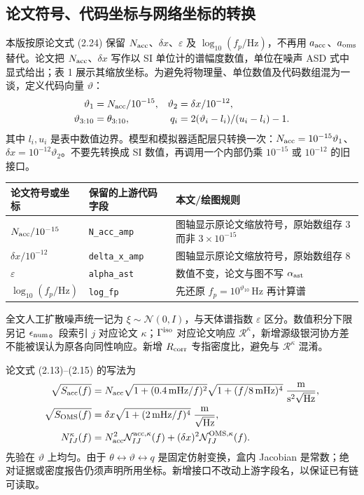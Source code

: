 \documentclass[UTF8,fontset=none,a4paper,11pt]{ctexart}
\begin{document}
\subsection{论文符号、代码坐标与网络坐标的转换}
本版按原论文式 (2.24) 保留 $N_{\rm acc}$、$\delta x$、$\varepsilon$ 及 $\log_{10}(f_p/\mathrm{Hz})$，不再用 $a_{\rm acc}$、$a_{\rm oms}$ 替代。论文把 $N_{\rm acc}$、$\delta x$ 写作以 SI 单位计的谱幅度数值，单位在噪声 ASD 式中显式给出；表 1 展示其缩放坐标。为避免将物理量、单位数值及代码数组混为一谈，定义代码向量 $\vartheta$：
\begin{align}
\vartheta_1&=N_{\rm acc}/10^{-15},&\vartheta_2&=\delta x/10^{-12},\\
\vartheta_{3:10}&=\theta_{3:10},&q_i&=2(\vartheta_i-l_i)/(u_i-l_i)-1.
\end{align}
其中 $l_i,u_i$ 是表中数值边界。模型和模拟器适配层只转换一次：$N_{\rm acc}=10^{-15}\vartheta_1$、$\delta x=10^{-12}\vartheta_2$。不要先转换成 SI 数值，再调用一个内部仍乘 $10^{-15}$ 或 $10^{-12}$ 的旧接口。
\par\noindent
\begin{tabularx}{\linewidth}{p{39mm}p{43mm}Y}\toprule
论文符号或坐标 & 保留的上游代码字段 & 本文/绘图规则\\\midrule
$N_{\rm acc}/10^{-15}$ & \texttt{N\_acc\_amp} & 图轴显示原论文缩放符号，原始数组存 3 而非 $3\times10^{-15}$\\
$\delta x/10^{-12}$ & \texttt{delta\_x\_amp} & 图轴显示原论文缩放符号，原始数组存 8\\
$\varepsilon$ & \texttt{alpha\_ast} & 数值不变，论文与图不写 $\alpha_{\rm ast}$\\
$\log_{10}(f_p/\mathrm{Hz})$ & \texttt{log\_fp} & 先还原 $f_p=10^{\vartheta_{10}}\,\mathrm{Hz}$ 再计算谱\\\bottomrule
\end{tabularx}
\par 全文人工扩散噪声统一记为 $\xi\sim\mathcal N(0,I)$，与天体谱指数 $\varepsilon$ 区分。数值积分下限另记 $\epsilon_{\rm num}$。段索引 $j$ 对应论文 $\kappa$；$\Gamma^{\rm iso}$ 对应论文响应 $\mathcal R^\kappa$，新增源级银河协方差不能被误认为原各向同性响应。新增 $R_{\rm corr}$ 专指密度比，避免与 $\mathcal R^\kappa$ 混淆。
\par 论文式 (2.13)--(2.15) 的写法为
\begin{align}
\sqrt{S_{\rm acc}(f)}&=N_{\rm acc}\sqrt{1+(0.4\,\mathrm{mHz}/f)^2}\sqrt{1+(f/8\,\mathrm{mHz})^4}\;\frac{\mathrm m}{\mathrm{s^2\sqrt{Hz}}},\\
\sqrt{S_{\rm OMS}(f)}&=\delta x\sqrt{1+(2\,\mathrm{mHz}/f)^4}\;\frac{\mathrm m}{\sqrt{\mathrm{Hz}}},\\
N^\kappa_{IJ}(f)&=N_{\rm acc}^{2}\mathcal N^{\rm acc,\kappa}_{IJ}(f)+(\delta x)^2\mathcal N^{\rm OMS,\kappa}_{IJ}(f).
\end{align}
先验在 $\vartheta$ 上均匀。由于 $\theta\leftrightarrow\vartheta\leftrightarrow q$ 是固定仿射变换，盒内 Jacobian 是常数；绝对证据或密度报告仍须声明所用坐标。新增接口不改动上游字段名，以保证已有链可读取。
\end{document}
